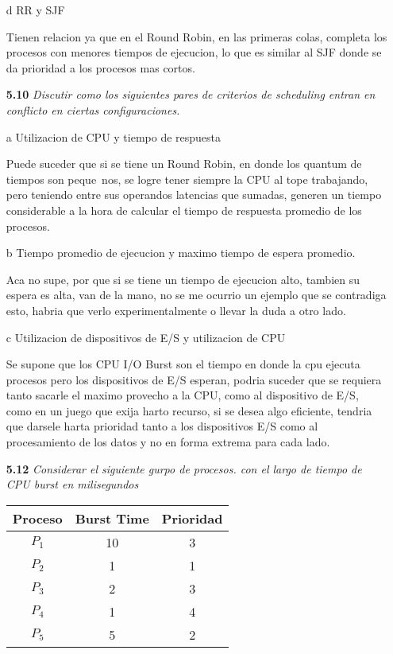 \begin{itemize}
\item[d] RR y SJF

Tienen relacion ya que en el Round Robin, en las primeras colas, completa los procesos con menores tiempos de ejecucion, lo que es similar al SJF donde se da prioridad a los procesos mas cortos.

\item[\textbf{5.10}]\emph{Discutir como los siguientes pares de criterios de scheduling entran en conflicto en ciertas configuraciones.}

\item[a] Utilizacion de CPU y tiempo de respuesta

Puede suceder que si se tiene un Round Robin, en donde los quantum de tiempos son peque~nos, se logre tener siempre la CPU al tope trabajando, pero teniendo entre sus operandos latencias que sumadas, generen un tiempo considerable a la hora de calcular el tiempo de respuesta promedio de los procesos.

\item[b] Tiempo promedio de ejecucion y maximo tiempo de espera promedio.

Aca no supe, por que si se tiene un tiempo de ejecucion alto, tambien su espera es alta, van de la mano, no se me ocurrio un ejemplo que se contradiga esto, habria que verlo experimentalmente o llevar la duda a otro lado.

\item[c] Utilizacion de dispositivos de E/S y utilizacion de CPU

Se supone que los CPU I/O  Burst son el tiempo en donde la cpu ejecuta procesos pero los dispositivos de E/S esperan, podria suceder que se requiera tanto sacarle el maximo provecho a la CPU, como al dispositivo de E/S, como en un juego que exija harto recurso, si se desea algo eficiente, tendria que darsele harta prioridad tanto a los dispositivos E/S como al procesamiento de los datos y no en forma extrema para cada lado.

\item[\textbf{5.12}]\emph{Considerar el siguiente gurpo de procesos. con el largo de tiempo de CPU burst en milisegundos}

\begin{tabular}{| c | c | c |}
\hline
Proceso & Burst Time & Prioridad\\\hline
$P_1$ & 10 & 3 \\
$P_2$ & 1 & 1\\
$P_3$ & 2 & 3\\
$P_4$ & 1 & 4\\
$P_5$ & 5 & 2\\\hline
\end{tabular}


\end{itemize}

